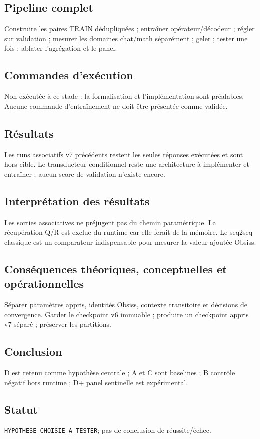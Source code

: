 \documentclass[11pt,a4paper]{report}
\begin{document}
\subsection{Pipeline complet}
Construire les paires TRAIN dédupliquées ; entraîner opérateur/décodeur ; régler sur validation ; mesurer les domaines chat/math séparément ; geler ; tester une fois ; ablater l'agrégation et le panel.
\subsection{Commandes d'exécution}
Non exécutée à ce stade : la formalisation et l'implémentation sont préalables. Aucune commande d'entraînement ne doit être présentée comme validée.
\subsection{Résultats}
Les runs associatifs v7 précédents restent les seules réponses exécutées et sont hors cible. Le transducteur conditionnel reste une architecture à implémenter et entraîner ; aucun score de validation n'existe encore.
\subsection{Interprétation des résultats}
Les sorties associatives ne préjugent pas du chemin paramétrique. La récupération Q/R est exclue du runtime car elle ferait de la mémoire. Le seq2seq classique est un comparateur indispensable pour mesurer la valeur ajoutée Obsiss.
\subsection{Conséquences théoriques, conceptuelles et opérationnelles}
Séparer paramètres appris, identités Obsiss, contexte transitoire et décisions de convergence. Garder le checkpoint v6 immuable ; produire un checkpoint appris v7 séparé ; préserver les partitions.
\subsection{Conclusion}
D est retenu comme hypothèse centrale ; A et C sont baselines ; B contrôle négatif hors runtime ; D+ panel sentinelle est expérimental.
\subsection{Statut}
\texttt{HYPOTHESE\_CHOISIE\_A\_TESTER}; pas de conclusion de réussite/échec.
\end{document}
